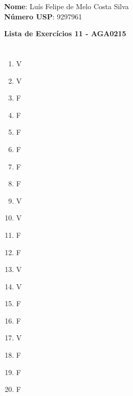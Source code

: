 \documentclass[12pt,letterpaper]{article}
\begin{document}
	
	\large \textbf{Nome}: Luís Felipe de Melo Costa Silva \\
	\textbf{Número USP}: 9297961 
    
	\begin{center}
		\LARGE \bf
		Lista de Exercícios 11 - AGA0215
	\end{center}
	
	\part{}
	
	\begin{multicols}{5}
		\begin{enumerate}
			\item V
			\item V
			\item F
			\item F
			\item F
			\item F
			\item F
			\item F
			\item V
			\item V
			\item F
			\item F
			\item V
			\item V
			\item F
			\item F
			\item V
			\item F
			\item F
			\item F
		\end{enumerate}
	\end{multicols}
	
\end{document}
